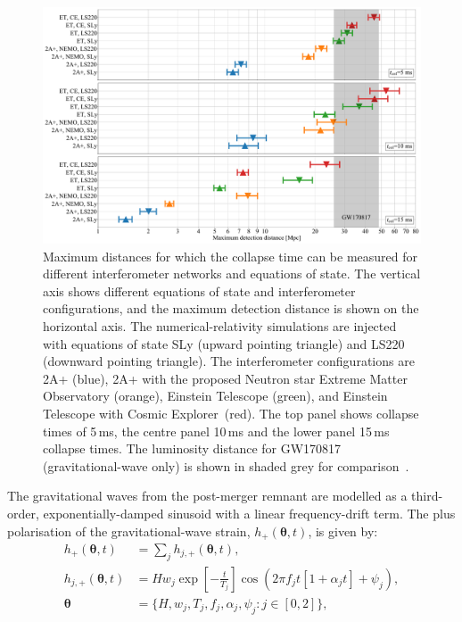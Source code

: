 \documentclass[
reprint,
prd,
twocolumn,
nofootinbib,
tightenlines %
floatfix,
 amsmath,
showpacs ,amssymb, aps,%
superscriptaddress
]{revtex4-1}
\begin{document}
\begin{figure}[t]
    \centering
    \includegraphics[scale=0.29]{MaximumDistancePanelLabelledGW170817.pdf}
    \caption{Maximum distances for which the collapse time can be measured for different interferometer networks and equations of state. The vertical axis shows different equations of state and interferometer configurations, and the maximum detection distance is shown on the horizontal axis. The numerical-relativity simulations are injected with equations of state SLy (upward pointing triangle) and LS220 (downward pointing triangle). The interferometer configurations are 2A+ (blue), 2A+ with the proposed Neutron star Extreme Matter Observatory (orange), Einstein Telescope (green), and Einstein Telescope with Cosmic Explorer~(red). The top panel shows collapse times of 5\,ms, the centre panel 10\,ms and the lower panel 15\,ms collapse times. The  luminosity distance for GW170817 (gravitational-wave only) is shown in shaded grey for comparison~\cite{GW170817multi}.} 
    \label{fig:CollapseTimeDistanceGrid}
\end{figure}  
        The gravitational waves from the post-merger remnant are modelled as a third-order, exponentially-damped sinusoid with a linear frequency-drift term. The plus polarisation of the gravitational-wave strain, $h_{+}(\boldsymbol{\theta},t)$, is given by: 
\begin{align}
        h_{+}(\boldsymbol{\theta},t) & = \sum_{j} h_{j,+}(\boldsymbol{\theta},t),\nonumber\\
        h_{j,+}(\boldsymbol{\theta},t) & = 
        H w_j \exp\left[-\frac{t}{T_j}\right] \cos \left(2\pi f_j t\left[1+\alpha_j t\right]+\psi_j \right),\nonumber\\
        \boldsymbol{\theta} & = \{H,w_j,T_j,f_j,\alpha_j,\psi_j :  j \in [0,2] \},\label{eq:hplus}
\end{align}
\end{document}
